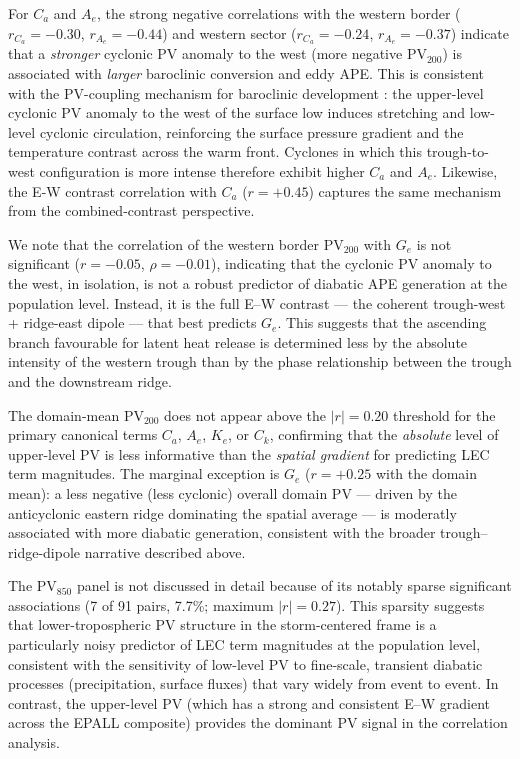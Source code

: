 For $C_a$ and $A_e$, the strong negative correlations with the western border
($r_{C_a} = -0.30$, $r_{A_e} = -0.44$) and western sector ($r_{C_a} = -0.24$,
$r_{A_e} = -0.37$) indicate that a \emph{stronger} cyclonic PV anomaly to the west
(more negative $\mathrm{PV}_{200}$) is associated with \emph{larger} baroclinic
conversion and eddy APE. This is consistent with the PV-coupling mechanism for
baroclinic development \citep{hoskins1985use,davis1991potential}: the upper-level
cyclonic PV anomaly to the west of the surface low induces stretching and low-level
cyclonic circulation, reinforcing the surface pressure gradient and the temperature
contrast across the warm front. Cyclones in which this trough-to-west configuration is
more intense therefore exhibit higher $C_a$ and $A_e$. Likewise, the E-W contrast
correlation with $C_a$ ($r = +0.45$) captures the same mechanism from the
combined-contrast perspective.

We note that the correlation of the western border $\mathrm{PV}_{200}$ with
$G_e$ is not significant ($r = -0.05$, $\rho = -0.01$), indicating that the
cyclonic PV anomaly to the west, in isolation, is not a robust predictor of diabatic
APE generation at the population level. Instead, it is the full E–W contrast — the
coherent trough-west + ridge-east dipole — that best predicts $G_e$. This suggests
that the ascending branch favourable for latent heat release is determined less by the
absolute intensity of the western trough than by the phase relationship between the
trough and the downstream ridge.

The domain-mean $\mathrm{PV}_{200}$ does not appear above the $|r| = 0.20$ threshold
for the primary canonical terms $C_a$, $A_e$, $K_e$, or $C_k$, confirming that the
\emph{absolute} level of upper-level PV is less informative than the \emph{spatial
gradient} for predicting LEC term magnitudes. The marginal exception is $G_e$
($r = +0.25$ with the domain mean): a less negative (less cyclonic) overall domain PV
— driven by the anticyclonic eastern ridge dominating the spatial average — is
moderatly associated with more diabatic generation, consistent with the broader
trough–ridge-dipole narrative described above.


The $\mathrm{PV}_{850}$ panel is not discussed in detail because of its notably sparse
significant associations (7 of 91 pairs, 7.7\%; maximum $|r| = 0.27$). This sparsity
suggests that lower-tropospheric PV structure in the storm-centered frame is a
particularly noisy predictor of LEC term magnitudes at the population level, consistent
with the sensitivity of low-level PV to fine-scale, transient diabatic processes
(precipitation, surface fluxes) that vary widely from event to event. In contrast,
the upper-level PV (which has a strong and consistent E–W gradient across the EPALL
composite) provides the dominant PV signal in the correlation analysis.

